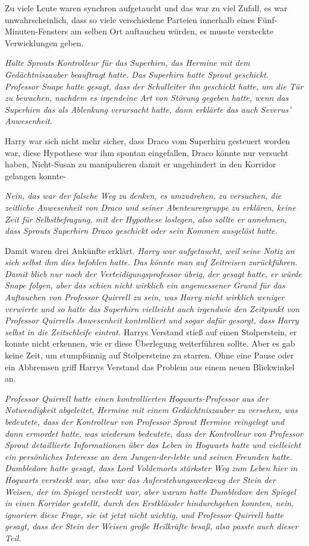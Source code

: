 Zu viele Leute waren synchron aufgetaucht und das war zu viel Zufall, es war
unwahrscheinlich, dass so viele verschiedene Parteien innerhalb eines
Fünf-Minuten-Fensters am selben Ort auftauchen würden, es musste versteckte
Verwicklungen geben.

\emph{Halte Sprouts Kontrolleur für das Superhirn, das Hermine mit dem
Gedächtniszauber beauftragt hatte. Das Superhirn hatte Sprout geschickt.
Professor Snape hatte gesagt, dass der Schulleiter ihn geschickt hatte, um die
Tür zu bewachen, nachdem es irgendeine Art von Störung gegeben hatte, wenn das
Superhirn das als Ablenkung verursacht hatte, dann erklärte das auch Severus'
Anwesenheit.}

Harry war sich nicht mehr sicher, dass Draco vom Superhirn gesteuert worden war,
diese Hypothese war ihm spontan eingefallen, Draco könnte nur versucht haben,
Nicht-Susan zu manipulieren damit er ungehindert in den Korridor gelangen
konnte-

\emph{Nein, das war der falsche Weg zu denken, es umzudrehen, zu versuchen, die zeitliche Anwesenheit von Draco und seiner Abenteurergruppe zu erklären, keine Zeit für Selbstbefragung, mit der Hypothese loslegen, also sollte er annehmen, dass Sprouts Superhirn Draco geschickt oder sein Kommen ausgelöst hatte.}

Damit waren drei Ankünfte erklärt. \emph{ Harry war aufgetaucht, weil seine
Notiz an sich selbst ihm dies befohlen hatte. Das könnte man auf Zeitreisen
zurückführen. Damit blieb nur noch der Verteidigungsprofessor übrig, der gesagt
hatte, er würde Snape folgen, aber das schien nicht wirklich ein angemessener
Grund für das Auftauchen von Professor Quirrell zu sein, was Harry nicht
wirklich weniger verwirrte und so hatte das Superhirn vielleicht auch irgendwie
den Zeitpunkt von Professor Quirrells Anwesenheit kontrolliert und sogar dafür
gesorgt, dass Harry selbst in die} \emph{Zeitschleife eintrat. } Harrys Verstand
stieß auf einen Stolperstein, er konnte nicht erkennen, wie er diese Überlegung
weiterführen sollte. Aber es gab keine Zeit, um stumpfsinnig auf Stolpersteine
zu starren. Ohne eine Pause oder ein Abbremsen griff Harrys Verstand das Problem
aus einem neuen Blickwinkel an.

\emph{Professor Quirrell hatte einen kontrollierten Hogwarts-Professor aus der
Notwendigkeit abgeleitet, Hermine mit einem Gedächtniszauber zu versehen, was
bedeutete, dass der Kontrolleur von Professor Sprout Hermine reingelegt und dann
ermordet hatte, was wiederum bedeutete, dass der Kontrolleur von Professor
Sprout detaillierte Informationen über das Leben in Hogwarts hatte und
vielleicht ein persönliches Interesse an dem Jungen-der-lebte und seinen
Freunden hatte. Dumbledore hatte gesagt, dass Lord Voldemorts stärkster Weg zum
Leben hier in Hogwarts versteckt war, also war das Auferstehungswerkzeug der
Stein der Weisen, der im Spiegel versteckt war, aber warum hatte Dumbledore den
Spiegel in einen Korridor gestellt, durch den Erstklässler hindurchgehen
konnten, nein, ignoriere diese Frage, sie ist jetzt nicht wichtig, und Professor
Quirrell hatte gesagt, dass der Stein der Weisen große Heilkräfte besaß, also
passte auch dieser Teil.}


